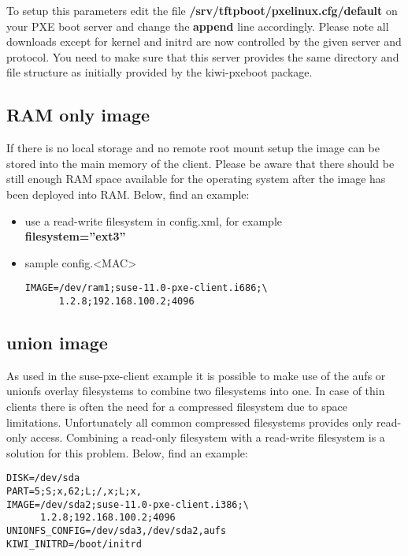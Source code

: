 To setup this parameters edit the file
\textbf{/srv/tftpboot/pxelinux.cfg/default} on your PXE boot server
and change the \textbf{append} line accordingly. Please note all
downloads except for kernel and initrd are now controlled by the given
server and protocol. You need to make sure that this server provides
the same directory and file structure as initially provided by
the kiwi-pxeboot package.

\subsection{RAM only image}

If there is no local storage and no remote root mount setup
the image can be stored into the main memory of the client.
Please be aware that there should be still enough RAM space
available for the operating system after the image has been
deployed into RAM. Below, find an example:

\begin{itemize}
\item use a read-write filesystem in config.xml, for example\\
      \textbf{filesystem=''ext3''}
\item sample config.<MAC>

\begin{Command}{12cm}
\begin{verbatim}
IMAGE=/dev/ram1;suse-11.0-pxe-client.i686;\
      1.2.8;192.168.100.2;4096
\end{verbatim}
\end{Command}
\end{itemize}

\subsection{union image}

As used in the suse-pxe-client example it is possible to make use of the
aufs or unionfs overlay filesystems to combine two filesystems
into one. In case of thin clients there is often the need for
a compressed filesystem due to space limitations. Unfortunately
all common compressed filesystems provides only read-only access.
Combining a read-only filesystem with a read-write filesystem
is a solution for this problem. Below, find an example:

\begin{Command}{12cm}
\begin{verbatim}
DISK=/dev/sda
PART=5;S;x,62;L;/,x;L;x,
IMAGE=/dev/sda2;suse-11.0-pxe-client.i386;\
      1.2.8;192.168.100.2;4096
UNIONFS_CONFIG=/dev/sda3,/dev/sda2,aufs
KIWI_INITRD=/boot/initrd
\end{verbatim}
\end{Command}

